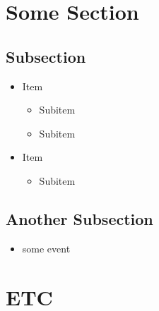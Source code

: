 \documentclass[english]{resume}
\date{\today}
\begin{document}
\maketitle

\section{Some Section}
\lipsum[1]
\subsection{Subsection}
\lipsum[2]
\begin{itemize}
		\item Item
			\begin{itemize}
				\item Subitem 
				\item Subitem 
			\end{itemize}
		\item Item
			\begin{itemize}
				\item Subitem
			\end{itemize}
	\end{itemize}
\subsection{Another Subsection}
	\begin{itemize}
		\item some event 
	\end{itemize}
	
\section{ETC}

\lipsum[2]
	
\end{document}
